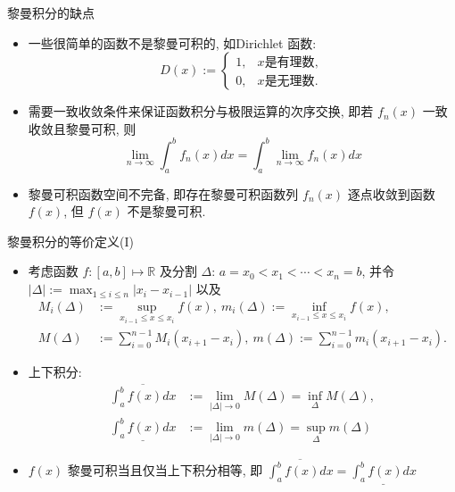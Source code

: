 \begin{frame}{黎曼积分的缺点}
	\begin{itemize}[<+-|alert@+>]
		\item 一些很简单的函数不是黎曼可积的, 如{\rm Dirichlet} 函数:
		\[D(x):=\left\{\begin{array}{ll}
			1, & x \mbox{是有理数},\\
			0, & x \mbox{是无理数}.
		\end{array}\right.\]
		\item 需要一致收敛条件来保证函数积分与极限运算的次序交换, 即若 $f_n(x)$ 一致收敛且黎曼可积, 则
		\[\lim_{n\rightarrow\infty}\int_a^bf_n(x)dx=\int_a^b\lim_{n\rightarrow\infty}f_n(x)dx\]
		\item 黎曼可积函数空间不完备, 即存在黎曼可积函数列 $f_n(x)$ 逐点收敛到函数 $f(x)$, 但 $f(x)$ 不是黎曼可积.
	\end{itemize}
\end{frame}

\begin{frame}{黎曼积分的等价定义(I)}
	\begin{itemize}[<+-|alert@+>]
		\item 考虑函数 $f:[a,b]\mapsto \mathbb{R}$ 及分割 $\Delta$: $a=x_0<x_1<\cdots<x_n=b$, 并令 $|\Delta|:=\max_{1\leq i\leq n}|x_i-x_{i-1}|$ 以及
		\begin{align*}
			M_i(\Delta)&:=\sup_{x_{i-1}\leq x\leq x_i}f(x), \  m_i(\Delta):=\inf_{x_{i-1}\leq x\leq x_i}f(x),\\
			M(\Delta)&:=\sum_{i=0}^{n-1}M_i(x_{i+1}-x_i), \ m(\Delta):=\sum_{i=0}^{n-1}m_i(x_{i+1}-x_i).
		\end{align*}
		\item 上下积分:
		\begin{align*}
			\overline{\int_a^bf(x)dx}&:=\lim_{|\Delta|\rightarrow 0}M(\Delta)=\inf_{\Delta} M(\Delta), \\
			\underline{\int_a^bf(x)dx}&:=\lim_{|\Delta|\rightarrow 0}m(\Delta)=\sup_{\Delta} m(\Delta)
		\end{align*}
		\item  $f(x)$ 黎曼可积当且仅当上下积分相等, 即	$\overline{\int_a^bf(x)dx}=\underline{\int_a^bf(x)dx}$
	\end{itemize}
\end{frame}

